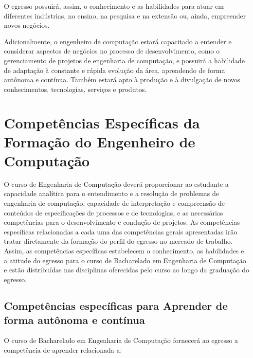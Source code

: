O egresso possuirá, assim, o conhecimento e as habilidades para atuar em diferentes indústrias, no ensino, na pesquisa e na extensão ou, ainda, empreender novos negócios.

Adicionalmente, o engenheiro de computação estará capacitado a entender e considerar aspectos de negócios no processo de desenvolvimento, como o gerenciamento de projetos de engenharia de computação, e possuirá a habilidade de adaptação à constante e rápida evolução da área, aprendendo de forma autônoma e contínua. Também estará apto à produção e à divulgação de novos conhecimentos, tecnologias, serviços e produtos.


\section{Competências Específicas da Formação do Engenheiro de Computação}\label{sec:competencias-especificas-da-formacao-do-engenheiro-de-computacao}

O curso de Engenharia de Computação deverá proporcionar ao estudante a capacidade analítica para o entendimento e a resolução de problemas de engenharia de computação, capacidade de interpretação e compreensão de conteúdos de especificações de processos e de tecnologias, e as necessárias competências para o desenvolvimento e condução de projetos. As competências específicas relacionadas a cada uma das competências gerais apresentadas irão tratar diretamente da formação do perfil do egresso no mercado de trabalho. Assim, as competências específicas estabelecem o conhecimento, as habilidades e a atitude do egresso para o curso de Bacharelado em Engenharia de Computação e estão distribuídas nas disciplinas oferecidas pelo curso ao longo da graduação do egresso.

\subsection*{Competências específicas para Aprender de forma autônoma e contínua}\label{sec:competencias-especificas-para-aprender-de-forma-autonoma-e-continua}

O curso de Bacharelado em Engenharia de Computação fornecerá ao egresso a competência de aprender relacionada a:

